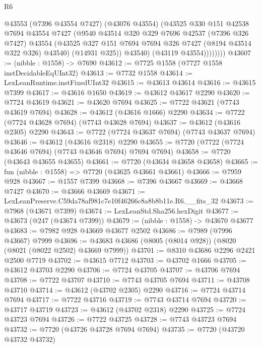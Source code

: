 \begin{lexlean}{R6}
\begin{coremodule}
                @43553
                  (@7396 @43554 @7427)
                  (@43076 @43554)
                  (@43525
                    @330
                    @151
                    @42538
                    @7694
                    @43554
                    @7427
                    (@9540
                      @43514
                      @320
                      @329
                      @7696
                      @42537
                      (@7396 @326 @7427)
                      @43554
                      (@43525 @327 @151 @7694 @7694 @326 @7427 (@8194 @43514 @322 @326) @43540)
                      (@14931 @325))
                    @43540)
                  (@43119 @43554))))))))
@43607 := (nibble : @1558) -> @7690
@43612 := @7725 @1558 (@7727 @1558 instDecidableEqUInt32)
@43613 := @7732 @1558
@43614 := LexLeanRuntime.instFixedUInt32
@43615 := @43613 @43614
@43616 := @43615 @7399
@43617 := @43616 @1650
@43619 := @43612 @43617 @2290
@43620 := @7724 @43619
@43621 := @43620 @7694
@43625 := @7722 @43621 (@7743 @43619 @7694)
@43628 := @43612 (@43616 @1666) @2290
@43634 := @7722 (@7724 @43628 @7694) (@7743 @43628 @7694)
@43637 := @43612 (@43616 @2305) @2290
@43643 := @7722 (@7724 @43637 @7694) (@7743 @43637 @7694)
@43646 := @43612 (@43616 @2318) @2290
@43655 := @7720 (@7722 (@7724 @43646 @7694) (@7743 @43646 @7694) @7694 @7694)
@43658 := @7720 (@43643 @43655 @43655)
@43661 := @7720 (@43634 @43658 @43658)
@43665 := fun (nibble : @1558) => @7720 (@43625 @43661 @43661)
@43666 := @7959 @928
@43667 := @1557 @7399
@43668 := @7396 @43667
@43669 := @43668 @7427
@43670 := @43666 @43669
@43671 := LexLeanPreserve.C59da78af981c7e10f46266c8a8b8b11e.R6.__fits_32
@43673 := @7968 (@43671 @7399)
@43674 := LexLeanStd.Sha256.hexDigit
@43677 := @43673 (@247 (@43674 @7399))
@43679 := (nibble : @1558) -> @43670 @43677
@43683 := @7982 @928 @43669 @43677 @2502
@43686 := @7989 (@7996 @43667) @7999
@43696 := @43683 @43686 (@8005 (@8014 @928)) (@8020 (@8021 (@8022 @2502) @43669 @7999))
@43701 := @8310 @43686 @2296 @2421 @2500 @7719
@43702 := @43615 @7712
@43703 := @43702 @1666
@43705 := @43612 @43703 @2290
@43706 := @7724 @43705
@43707 := @43706 @7694
@43708 := @7722 @43707
@43710 := @7743 @43705 @7694
@43711 := @43708 @43710
@43714 := @43612 (@43702 @2305) @2290
@43716 := @7724 @43714 @7694
@43717 := @7722 @43716
@43719 := @7743 @43714 @7694
@43720 := @43717 @43719
@43723 := @43612 (@43702 @2318) @2290
@43725 := @7724 @43723 @7694
@43726 := @7722 @43725
@43728 := @7743 @43723 @7694
@43732 := @7720 (@43726 @43728 @7694 @7694)
@43735 := @7720 (@43720 @43732 @43732)

\end{coremodule}
\end{lexlean}
